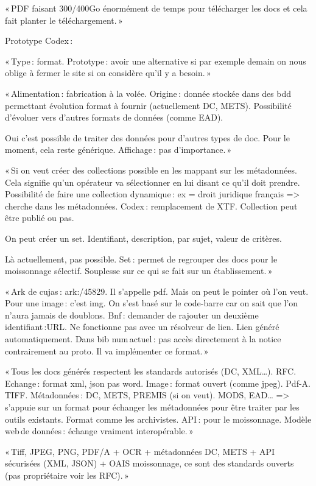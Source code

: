 « PDF faisant 300/400Go énormément de temps pour télécharger les docs et cela fait planter le téléchargement. » 

Prototype Codex : 

« Type : format. Prototype : avoir une alternative si par exemple demain on nous oblige à fermer le site si on considère qu’il y a besoin. » 

« Alimentation : fabrication à la volée. Origine : donnée stockée dans des bdd permettant évolution format à fournir (actuellement DC, METS). Possibilité d’évoluer vers d’autres formats de données (comme EAD).  

Oui c’est possible de traiter des données pour d’autres types de doc. Pour le moment, cela reste générique. Affichage : pas d’importance. » 

« Si on veut créer des collections possible en les mappant sur les métadonnées. Cela signifie qu’un opérateur va sélectionner en lui disant ce qu’il doit prendre. Possibilité de faire une collection dynamique : ex = droit juridique français => cherche dans les métadonnées. Codex : remplacement de XTF. Collection peut être publié ou pas.  

On peut créer un set. Identifiant, description, par sujet, valeur de critères.  

Là actuellement, pas possible. Set : permet de regrouper des docs pour le moissonnage sélectif. Souplesse sur ce qui se fait sur un établissement. » 

« Ark de cujas : ark:/45829. Il s’appelle pdf. Mais on peut le pointer où l’on veut. Pour une image : c’est img. On s’est basé sur le code-barre car on sait que l’on n’aura jamais de doublons. Bnf : demander de rajouter un deuxième identifiant :URL. Ne fonctionne pas avec un résolveur de lien. Lien généré automatiquement. Dans bib num actuel : pas accès directement à la notice contrairement au proto. Il va implémenter ce format. » 

« Tous les docs générés respectent les standards autorisés (DC, XML…). RFC. Echange : format xml, json pas word. Image : format ouvert (comme jpeg). Pdf-A. TIFF. Métadonnées : DC, METS, PREMIS (si on veut). MODS, EAD… => s’appuie sur un format pour échanger les métadonnées pour être traiter par les outils existants. Format comme les archivistes. API : pour le moissonnage. Modèle web de données : échange vraiment interopérable. »  

« Tiff, JPEG, PNG, PDF/A + OCR + métadonnées DC, METS + API sécurisées (XML, JSON) + OAIS moissonnage, ce sont des standards ouverts (pas propriétaire voir les RFC). » 

